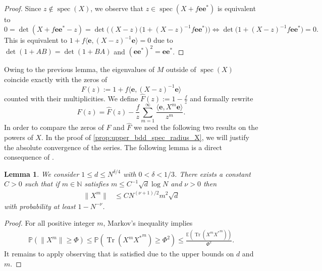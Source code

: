 \documentclass[11pt]{article}
\DeclareMathOperator{\Tr}{Tr}
\DeclareMathOperator{\spec}{spec}
\newcommand{\N}{\mathbb{N}}
\theoremstyle{plain}
\newtheorem{lemma}{Lemma}[section]
\theoremstyle{remark}
\numberwithin{equation}{section}
\begin{document}
\begin{proof} 
Since $z \notin \spec(X)$, we observe that $z \in \spec(X + f \mathbf e \mathbf e^*)$ is equivalent to  
\[ 
0 = \det(X + f \mathbf e \mathbf e^*- z) = \det\big( (X-z) \big( 1 + (X-z)^{-1} f \mathbf e \mathbf e^*\big)\big) \iff \det\big( 1 + (X-z)^{-1} f \mathbf e \mathbf e^*\big) = 0.
\] 
This is equivalent to $1 + f\langle \mathbf e, (X-z)^{-1} \mathbf e \rangle =0$ due to 
$\det(1 + AB) = \det(1 + BA)$ and $(\mathbf e \mathbf e^*)^2 =\mathbf e \mathbf e^*$. 
\end{proof} 
 Owing to the previous lemma, the eigenvalues of $M$ outside of $\spec(X)$ coincide exactly with the zeros  of 
\begin{equation} \label{eq:def_spectral_function1}  
F(z) := 1 + f \langle \mathbf e , (X-z)^{-1} \mathbf e \rangle 
\end{equation}
counted with their multiplicities. 
We define $\widehat{F}(z) := 1-\frac{f}{z}$ and formally rewrite 
\begin{equation}\label{eq:def_spectral_funct}
    F(z) = \widehat{F}(z) - \frac{f}{z}\sum_{m=1}^{\infty}\frac{\langle \mathbf{e}, X^m \mathbf{e} \rangle }{z^m }.
\end{equation}
In order to compare the zeros of $F$ and $\widehat{F}$ we need the following two results on the powers of $X$. In the proof of \cref{prop:upper_bdd_spec_radius_X}, we will justify the absolute convergence of the series. The following lemma is a direct consequence of \cite[Proposition 6.1]{BBK_spec_radii}.
\begin{lemma} \label{lem:norm_X_m} 
We consider $1 \le d \le N^{\delta/4}$ with $0<\delta < 1/3$. There exists a constant $C>0$ such that if $m \in \N$ satisfies $m \le  C^{-1} \sqrt{d} \log N$ and $\nu>0$ then 
    \begin{align*}
    \|X^m \| &\le C N^{ (\nu+1)/2} m^2 \sqrt{d}
    \end{align*}
    with probability at least $1 - N^{- \nu}$.
    \end{lemma} 

\begin{proof}
    For all positive integer $m$, Markov's inequality implies 
    \begin{align*}
        \mathbb{P} \left( \|X^m\| \ge \Phi \right) \le \mathbb{P} \left( \Tr(X^m {X^\ast}^m ) \ge \Phi^2  \right)   \le \frac{\mathbb{E}\left(\Tr(X^m {X^\ast}^m ) \right)}{\Phi^2}.
    \end{align*}
    It remains to apply \cite[Proposition 6.1]{BBK_spec_radii}
    observing that \cite[(5.1)]{BBK_spec_radii} is satisfied due to 
    the upper bounds on $d$ and $m$.
\end{proof}
\end{document}
